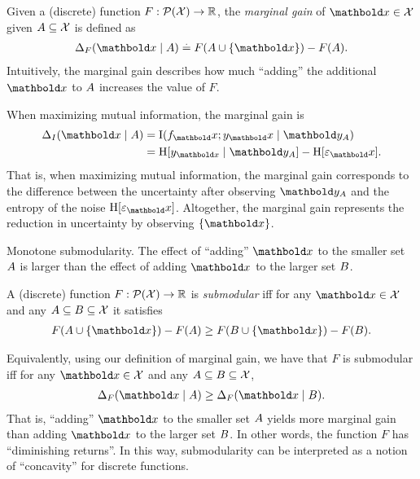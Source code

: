 \begin{defn}
  Given a (discrete) function ${F : \pset{\spX} \to \R}$, the \emph{marginal gain} of $\vx \in \spX$ given $A \subseteq \mathcal{X}$ is defined as \begin{align}
    \Delta_F(\vx \mid \sA) \defeq F(\sA \cup \{\vx\}) - F(\sA). \label{eq:marginal_gain}
  \end{align}
  Intuitively, the marginal gain describes how much ``adding'' the additional $\vx$ to $A$ increases the value of $F$.
\end{defn}
When maximizing mutual information, the marginal gain is  \begin{align}
  \Delta_I(\vx \mid \sA) &= \Ism{f_\vx}{y_\vx}[\vy_\sA] \label{eq:mg_mi} \\
  &= \H{y_{\vx} \mid \vy_\sA} - \H{\varepsilon_\vx}. \label{eq:mg_decomp}
\end{align}
That is, when maximizing mutual information, the marginal gain corresponds to the difference between the uncertainty after observing $\vy_\sA$ and the entropy of the noise $\H{\varepsilon_\vx}$.
Altogether, the marginal gain represents the reduction in uncertainty by observing $\{\vx\}$.

\begin{marginfigure}
  \caption{Monotone submodularity.
  The effect of ``adding'' $\vx$ to the smaller set $A$ is larger than the effect of adding $\vx$ to the larger set $B$.}
\end{marginfigure}

\begin{defn}[Submodularity]
  A (discrete) function $F : \pset{\spX} \to \R$ is \emph{submodular} iff for any $\vx \in \spX$ and any $A \subseteq B \subseteq \mathcal{X}$ it satisfies \begin{align}
    F(\sA \cup \{\vx\}) - F(\sA) \geq F(\sB \cup \{\vx\}) - F(\sB). \label{eq:submodularity}
  \end{align}
\end{defn}

Equivalently, using our definition of marginal gain, we have that $F$ is submodular iff for any $\vx \in \spX$ and any $A \subseteq B \subseteq \mathcal{X}$, \begin{align}
  \Delta_F(\vx \mid \sA) \geq \Delta_F(\vx \mid \sB). \label{eq:submodularity_mg}
\end{align}
That is, ``adding'' $\vx$ to the smaller set $A$ yields more marginal gain than adding $\vx$ to the larger set $B$.
In other words, the function $F$ has ``diminishing returns''.
In this way, submodularity can be interpreted as a notion of ``concavity'' for discrete functions.

